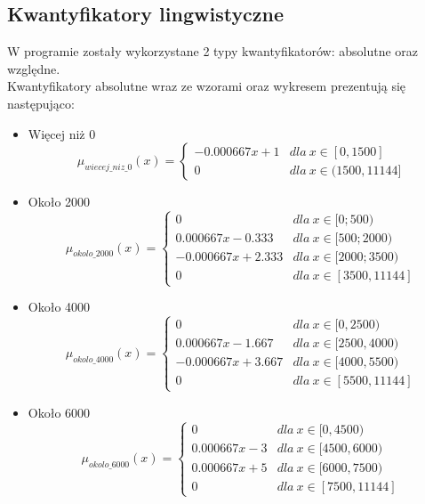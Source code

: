 \documentclass{classrep}
\begin{document}
\subsection{Kwantyfikatory lingwistyczne}
W programie zostały wykorzystane 2 typy kwantyfikatorów: absolutne oraz względne.\\
Kwantyfikatory absolutne wraz ze wzorami oraz wykresem prezentują się następująco:
\begin{itemize}
        \item Więcej niż 0
        \begin{equation}
            \mu_{wiecej\_niz\_0}(x) = \left\{\begin{matrix} -0.000667x + 1 & dla \: x\in[0, 1500] \\ 0 & dla  \: x\in (1500, 11144] \end{matrix}\right.
        \end{equation}
        \item Około 2000
        \begin{equation}
            \mu_{okolo\_2000}(x) = \left\{\begin{matrix} 0 & dla \: x\in [0;500) \\ 0.000667x - 0.333 & dla \: x\in[500;2000) \\ -0.000667x + 2.333& dla \: x\in [2000; 3500) \\ 0 & dla \: x\in[3500, 11144] \end{matrix}\right.
        \end{equation}
        \item Około 4000
        \begin{equation}
            \mu_{okolo\_4000}(x) = \left\{\begin{matrix} 0 & dla \: x\in [0, 2500) \\ 0.000667x - 1.667 & dla \: x\in[2500, 4000) \\ -0.000667x + 3.667 & dla \: x\in [4000, 5500) \\ 0 & dla \: x\in[5500, 11144] \end{matrix}\right.
        \end{equation}
        \item Około 6000
        \begin{equation}
            \mu_{okolo\_6000}(x) = \left\{\begin{matrix} 0 & dla \: x\in [0, 4500) \\ 0.000667x - 3 & dla \: x\in[4500, 6000) \\ 0.000667x + 5 & dla \: x\in [6000, 7500) \\ 0 & dla \: x\in[7500, 11144] \end{matrix}\right.

\end{equation}
\end{itemize}
\end{document}
